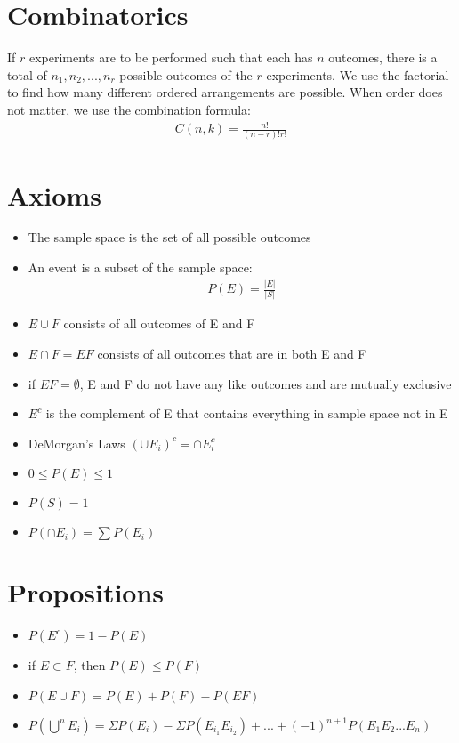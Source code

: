 \documentclass[12pt]{article}
\begin{document}
	\maketitle
	
\section{Combinatorics}
If $r$ experiments are to be performed such that each has $n$ outcomes, there is a total of $n_1, n_2, ..., n_r$ possible outcomes of the $r$ experiments. We use the factorial to find how many different ordered arrangements are possible. When order does not matter, we use the combination formula:
\begin{align*}
  C(n,k) = \frac{n!}{(n-r)!r!}
\end{align*}

\section{Axioms}
\begin{itemize}
	\item The sample space is the set of all possible outcomes
	\item An event is a subset of the sample space:
	\begin{align*}
		P(E) = \frac{|E|}{|S|}
	\end{align*}
	\item $E\cup F$ consists of all outcomes of E and F
	\item $E\cap F=EF$ consists of all outcomes that are in both E and F
	\item if $EF = \emptyset$, E and F do not have any like outcomes and are mutually exclusive
	\item $E^c$ is the complement of E that contains everything in sample space not in E
	\item DeMorgan's Laws $(\cup E_i)^c = \cap E^c_i$
	\item $0 \le P(E) \le 1$
	\item $P(S) = 1$
	\item $P(\cap E_i) = \sum P(E_i)$
\end{itemize}

\section{Propositions}
\begin{itemize}
	\item $P(E^c) = 1 - P(E)$
	\item if $E\subset F$, then $P(E) \le P(F)$
	\item $P(E \cup F) = P(E) + P(F) - P(EF)$
	\item $P(\bigcup^n E_i) = \Sigma P(E_i) - \Sigma P(E_{i_1} E_{i_2}) + ... + (-1)^{n+1} P(E_1 E_2 ... E_n)$
\end{itemize}
\end{document}

